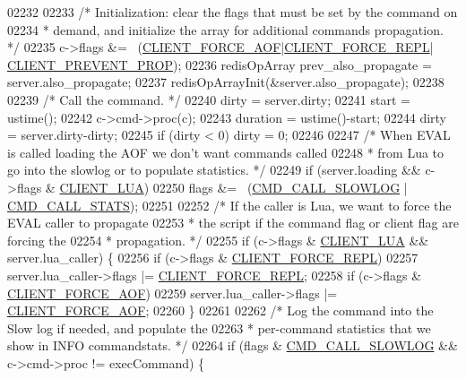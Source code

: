 \begin{DoxyCode}
{{{{{{{{{{{{{{{{{{{{{{{{{{{{{02232 
02233     \textcolor{comment}{/* Initialization: clear the flags that must be set by the command on}
02234 \textcolor{comment}{     * demand, and initialize the array for additional commands propagation. */}
02235     c->flags &= ~(\hyperlink{server_8h_a451c1542a74f0181600d043df3f1b19a}{CLIENT\_FORCE\_AOF}|\hyperlink{server_8h_a9f89484284fb0956374bd7b6fa639602}{CLIENT\_FORCE\_REPL}|
      \hyperlink{server_8h_aea3bfee2e140aed0fc93bf087026f9a3}{CLIENT\_PREVENT\_PROP});
02236     redisOpArray prev\_also\_propagate = server.also\_propagate;
02237     redisOpArrayInit(&server.also\_propagate);
02238 
02239     \textcolor{comment}{/* Call the command. */}
02240     dirty = server.dirty;
02241     start = ustime();
02242     c->cmd->proc(c);
02243     duration = ustime()-start;
02244     dirty = server.dirty-dirty;
02245     \textcolor{keywordflow}{if} (dirty < 0) dirty = 0;
02246 
02247     \textcolor{comment}{/* When EVAL is called loading the AOF we don't want commands called}
02248 \textcolor{comment}{     * from Lua to go into the slowlog or to populate statistics. */}
02249     \textcolor{keywordflow}{if} (server.loading && c->flags & \hyperlink{server_8h_af9d0b0f45ef2c1fd29ac714a300de706}{CLIENT\_LUA})
02250         flags &= ~(\hyperlink{server_8h_a934cea7b13db05a29264146cd5b14064}{CMD\_CALL\_SLOWLOG} | \hyperlink{server_8h_a7b1d9cf5be21e4808da0c16f03155973}{CMD\_CALL\_STATS});
02251 
02252     \textcolor{comment}{/* If the caller is Lua, we want to force the EVAL caller to propagate}
02253 \textcolor{comment}{     * the script if the command flag or client flag are forcing the}
02254 \textcolor{comment}{     * propagation. */}
02255     \textcolor{keywordflow}{if} (c->flags & \hyperlink{server_8h_af9d0b0f45ef2c1fd29ac714a300de706}{CLIENT\_LUA} && server.lua\_caller) \{
02256         \textcolor{keywordflow}{if} (c->flags & \hyperlink{server_8h_a9f89484284fb0956374bd7b6fa639602}{CLIENT\_FORCE\_REPL})
02257             server.lua\_caller->flags |= \hyperlink{server_8h_a9f89484284fb0956374bd7b6fa639602}{CLIENT\_FORCE\_REPL};
02258         \textcolor{keywordflow}{if} (c->flags & \hyperlink{server_8h_a451c1542a74f0181600d043df3f1b19a}{CLIENT\_FORCE\_AOF})
02259             server.lua\_caller->flags |= \hyperlink{server_8h_a451c1542a74f0181600d043df3f1b19a}{CLIENT\_FORCE\_AOF};
02260     \}
02261 
02262     \textcolor{comment}{/* Log the command into the Slow log if needed, and populate the}
02263 \textcolor{comment}{     * per-command statistics that we show in INFO commandstats. */}
02264     \textcolor{keywordflow}{if} (flags & \hyperlink{server_8h_a934cea7b13db05a29264146cd5b14064}{CMD\_CALL\_SLOWLOG} && c->cmd->proc != execCommand) \{
}}}}}}}}}}}}}}}}}}}}}}}}}}}}}
\end{DoxyCode}
